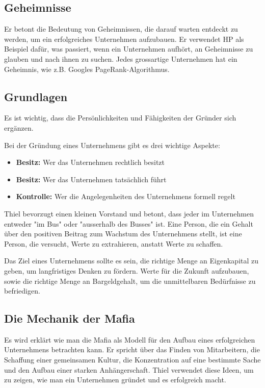 \documentclass[10pt]{article}
\begin{document}
\subsection{Geheimnisse}

Er betont die Bedeutung von Geheimnissen, die darauf warten entdeckt zu werden, um ein erfolgreiches Unternehmen aufzubauen. Er verwendet HP als Beispiel dafür, was passiert, wenn ein Unternehmen aufhört, an Geheimnisse zu glauben und nach ihnen zu suchen. Jedes grossartige Unternehmen hat ein Geheimnis, wie z.B. Googles PageRank-Algorithmus.

\subsection{Grundlagen}

Es ist wichtig, dass die Persönlichkeiten und Fähigkeiten der Gründer sich ergänzen.

Bei der Gründung eines Unternehmens gibt es drei wichtige Aspekte:

\begin{itemize}
\item \textbf{Besitz:} Wer das Unternehmen rechtlich besitzt
\item \textbf{Besitz:} Wer das Unternehmen tatsächlich führt
\item \textbf{Kontrolle:} Wer die Angelegenheiten des Unternehmens formell regelt
\end{itemize}

Thiel bevorzugt einen kleinen Vorstand und betont, dass jeder im Unternehmen entweder "im Bus" oder "ausserhalb des Busses" ist. Eine Person, die ein Gehalt über den positiven Beitrag zum Wachstum des Unternehmens stellt, ist eine Person, die versucht, Werte zu extrahieren, anstatt Werte zu schaffen.

Das Ziel eines Unternehmens sollte es sein, die richtige Menge an Eigenkapital zu geben, um langfristiges Denken zu fördern. Werte für die Zukunft aufzubauen, sowie die richtige Menge an Bargeldgehalt, um die unmittelbaren Bedürfnisse zu befriedigen.

\subsection{Die Mechanik der Mafia}

Es wird erklärt wie man die Mafia als Modell für den Aufbau eines erfolgreichen Unternehmens betrachten kann. Er spricht über das Finden von Mitarbeitern, die Schaffung einer gemeinsamen Kultur, die Konzentration auf eine bestimmte Sache und den Aufbau einer starken Anhängerschaft. Thiel verwendet diese Ideen, um zu zeigen, wie man ein Unternehmen gründet und es erfolgreich macht.
\end{document}
